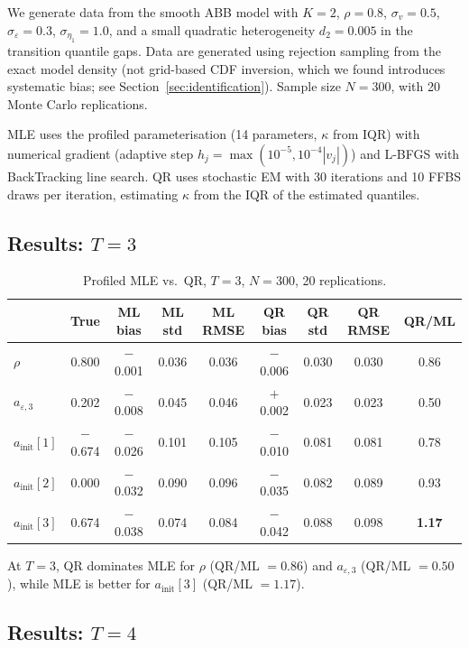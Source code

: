 \documentclass[12pt]{article}
\begin{document}
We generate data from the smooth ABB model with $K = 2$, $\rho = 0.8$,
$\sigma_v = 0.5$, $\sigma_\varepsilon = 0.3$, $\sigma_{\eta_1} = 1.0$,
and a small quadratic heterogeneity $d_2 = 0.005$ in the transition quantile
gaps.
Data are generated using rejection sampling from the exact model density
(not grid-based CDF inversion, which we found introduces systematic bias;
see Section~\ref{sec:identification}).
Sample size $N = 300$, with 20 Monte Carlo replications.

MLE uses the profiled parameterisation (14 parameters, $\kappa$ from IQR)
with numerical gradient (adaptive step $h_j = \max(10^{-5}, 10^{-4}|v_j|)$)
and L-BFGS with BackTracking line search.
QR uses stochastic EM with 30 iterations and 10 FFBS draws per iteration,
estimating $\kappa$ from the IQR of the estimated quantiles.

\subsection{Results: $T = 3$}

\begin{table}[H]
\centering
\caption{Profiled MLE vs.\ QR, $T = 3$, $N = 300$, 20 replications.}
\label{tab:profiled_T3}
\begin{tabular}{lcccccccc}
\toprule
 & True & ML bias & ML std & ML RMSE & QR bias & QR std & QR RMSE & QR/ML \\
\midrule
$\rho$       & 0.800 & $-$0.001 & 0.036 & 0.036 & $-$0.006 & 0.030 & 0.030 & 0.86 \\
$a_{\varepsilon,3}$ & 0.202 & $-$0.008 & 0.045 & 0.046 & $+$0.002 & 0.023 & 0.023 & 0.50 \\
$a_{\text{init}}[1]$ & $-$0.674 & $-$0.026 & 0.101 & 0.105 & $-$0.010 & 0.081 & 0.081 & 0.78 \\
$a_{\text{init}}[2]$ & 0.000 & $-$0.032 & 0.090 & 0.096 & $-$0.035 & 0.082 & 0.089 & 0.93 \\
$a_{\text{init}}[3]$ & 0.674 & $-$0.038 & 0.074 & 0.084 & $-$0.042 & 0.088 & 0.098 & \textbf{1.17} \\
\bottomrule
\end{tabular}
\end{table}

\noindent
At $T = 3$, QR dominates MLE for $\rho$ (QR/ML $= 0.86$) and
$a_{\varepsilon,3}$ (QR/ML $= 0.50$), while MLE is better for $a_{\text{init}}[3]$
(QR/ML $= 1.17$).

\subsection{Results: $T = 4$}
\end{document}
